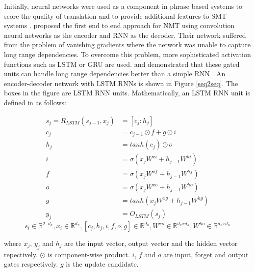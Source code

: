 
Initially, neural networks were used as a component in phrase based systems to score the quality of translation \citep{schwenk2012continuous} and to provide additional features to SMT systems \citep{zou2013bilingual}. \cite{kalchbrenner2013recurrent} proposed the first end to end approach for NMT using convolution neural networks as the encoder and RNN as the decoder. Their network suffered from the problem of vanishing gradients where the network was unable to capture long range dependencies. To overcome this problem, more sophisticated activation functions such as LSTM \citep{hochreiter1997long} or GRU \citep{cho2014learning} are used.  \cite{sutskever2014sequence} and \cite{cho2014learning} demonstrated that these gated units can handle long range dependencies better than a simple RNN \citep{elman1990finding}. An encoder-decoder network with LSTM RNNs is shown in Figure \ref{seq2seq}. The boxes in the figure are LSTM RNN units. Mathematically, an LSTM RNN unit is defined in \cite{goldberg2016primer} as follows:

\begin{align}
s_j = R_{LSTM}(s_{j-1}, x_j) &= [c_j:h_j] \\
c_j &= c_{j-1} \odot f + g \odot i \\
h_j &= tanh(c_j) \odot o \\
i &= \sigma(x_j W^{xi} + h_{j-1} W^{hi})\\
f &= \sigma(x_j W^{xf} + h_{j-1} W^{hf})\\
o &= \sigma(x_j W^{xo} + h_{j-1} W^{ho})\\
g &= tanh(x_j W^{xg} + h_{j-1}W^{hg})\\
y_j &= O_{LSTM}(s_j)
\end{align}
\[ 
s_i \in \mathbb{R}^{2 \cdot d_{h}}, x_i \in \mathbb{R}^{d_{x}}, [c_j, h_j, i, f, o, g] \in \mathbb{R}^{{d_{h}}}, W^{xo} \in \mathbb{R}^{d_x x d_h}, W^{ho} \in \mathbb{R}^{d_h x d_h}  \]

where $x_j$, $y_j$ and $h_j$ are the input vector, output vector and the hidden vector repectively. $\odot$ is component-wise product. $i$, $f$ and $o$ are input, forget and output gates respectively. $g$ is the update candidate.

